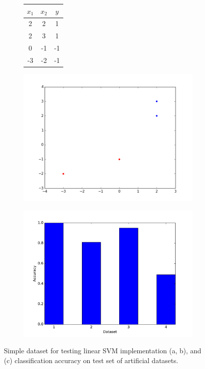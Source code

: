 \documentclass[10pt,psamsfonts]{amsart}
\theoremstyle{definition}
\theoremstyle{remark}
\numberwithin{equation}{section}
\begin{document}
\begin{figure}[h!]
	\centering
\begin{subfigure}[b]{0.15\textwidth}
	\centering
\begin{tabular}{|c|c|c|}\hline
$x_1$ & $x_2$ & $y$ \\\hline
2 & 2 & 1 \\
2 & 3 & 1 \\
0 & -1 & -1\\
-3 & -2 & -1\\\hline
\end{tabular}
\vspace{0.3in}
\caption{}
\end{subfigure}
\begin{subfigure}[b]{0.3\textwidth}
\includegraphics[width=\textwidth]{hw2-2_1-1.png}
\caption{}
\end{subfigure}
\begin{subfigure}[b]{0.3\textwidth}
	\includegraphics[width=\textwidth]{hw2_2-2_acc.pdf}
	\caption{}
\end{subfigure}
\caption{Simple dataset for testing linear SVM implementation (a, b), and (c) classification accuracy on test set of artificial datasets.}
\end{figure}
\end{document}
